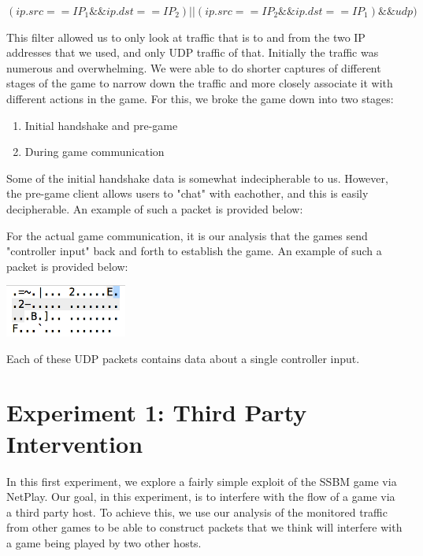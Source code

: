 \documentclass[conference]{IEEEtran}
\begin{document}
$ ( ip.src == IP_1 \&\& ip.dst == IP_2 ) || (ip.src == IP_2 \&\& ip.dst == IP_1) \&\& udp) $

\vspace{0.3cm}
This filter allowed us to only look at traffic that is to and from the two IP addresses that we used, and only UDP traffic of that.
Initially the traffic was numerous and overwhelming.
We were able to do shorter captures of different stages of the game to narrow down the traffic and more closely associate it with different actions in the game.
For this, we broke the game down into two stages:
\begin{enumerate}  
\item Initial handshake and pre-game
\item During game communication
\end{enumerate}
\vspace{0.5cm}

Some of the initial handshake data is somewhat indecipherable to us. 
However, the pre-game client allows users to "chat" with eachother, and this is easily decipherable. 
An example of such a packet is provided below:
\vspace{0.5cm}

For the actual game communication, it is our analysis that the games send "controller input" back and forth to establish the game. An example of such a packet is provided below:
\vspace{0.5cm}
\begin{center}
\includegraphics[width=4cm]{Figures/Packet}
\end{center}
\vspace{0.5cm}

Each of these UDP packets contains data about a single controller input.
\section{Experiment 1: Third Party Intervention}
In this first experiment, we explore a fairly simple exploit of the SSBM game via NetPlay.
Our goal, in this experiment, is to interfere with the flow of a game via a third party host.
To achieve this, we use our analysis of the monitored traffic from other games to be able to construct packets that we think will interfere with a game being played by two other hosts. 
\end{document}
